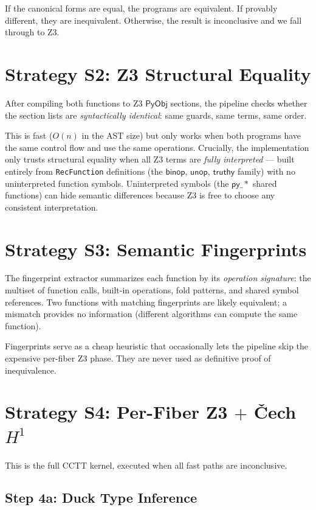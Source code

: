 \documentclass[11pt,a4paper]{report}
\theoremstyle{definition}
\theoremstyle{plain}
\newcommand{\PyObj}{\mathsf{PyObj}}
\newcommand{\Hone}{H^1}
\begin{document}
If the canonical forms are equal, the programs are equivalent.
If provably different, they are inequivalent.  Otherwise, the
result is inconclusive and we fall through to Z3.

\section{Strategy S2: Z3 Structural Equality}

After compiling both functions to Z3 $\PyObj$ sections, the pipeline
checks whether the section lists are \emph{syntactically identical}:
same guards, same terms, same order.

This is fast ($O(n)$ in the AST size) but only works when both
programs have the same control flow and use the same operations.
Crucially, the implementation only trusts structural equality when
all Z3 terms are \emph{fully interpreted} --- built entirely from
\texttt{RecFunction} definitions (the $\mathsf{binop}$,
$\mathsf{unop}$, $\mathsf{truthy}$ family) with no uninterpreted
function symbols.  Uninterpreted symbols (the $\mathsf{py\_*}$
shared functions) can hide semantic differences because Z3 is free
to choose any consistent interpretation.

\section{Strategy S3: Semantic Fingerprints}

The fingerprint extractor summarizes each function by its
\emph{operation signature}: the multiset of function calls,
built-in operations, fold patterns, and shared symbol references.
Two functions with matching fingerprints are likely equivalent; a
mismatch provides no information (different algorithms can compute
the same function).

Fingerprints serve as a cheap heuristic that occasionally lets the
pipeline skip the expensive per-fiber Z3 phase.  They are never
used as definitive proof of inequivalence.

\section{Strategy S4: Per-Fiber Z3 $+$ \v{C}ech $\Hone$}

This is the full CCTT kernel, executed when all fast paths are
inconclusive.

\subsection{Step 4a: Duck Type Inference}
\end{document}
